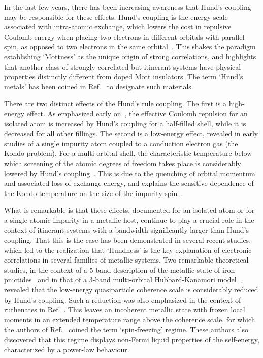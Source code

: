 \documentclass[]{ar2e-changed}%
\begin{document}
In the last few years, there has been increasing awareness that Hund's coupling may be responsible 
for these effects. 
%
Hund's coupling is the energy scale associated with intra-atomic exchange, which lowers the cost in repulsive 
Coulomb energy when placing two electrons in different orbitals with parallel spin, as opposed to two 
electrons in the same orbital~\cite{hund_1925}. 
%
This shakes the paradigm establishing `Mottness' as the unique origin of strong correlations, and 
highlights that another class of strongly correlated but itinerant systems 
have physical properties distinctly different from doped Mott insulators.
%
The term `Hund's metals' has been coined in Ref.~\cite{Yin_kinetic_frustration_allFeSC} to designate such materials. 

There are two distinct effects of the Hund's rule coupling. 
% 
The first is a high-energy effect. As emphasized early on~\cite{vandermarel_sawatzky_prb_1988,vandermarel_phd_1985}, 
the effective Coulomb repulsion for an isolated atom is increased by Hund's coupling for a half-filled shell, 
while it is decreased for all other fillings.
%
The second is a low-energy effect, revealed in early studies of a single impurity atom coupled to a 
conduction electron gas (the Kondo problem). For a multi-orbital shell, the characteristic temperature 
below which screening of the atomic degrees of freedom takes place is considerably lowered 
by Hund's coupling~\cite{okada73,jayaprakash81,jones87,kusunose97,yotsuhashi01,pruschke_epjb_2005,nevidomskiy09}.
%
This is due to the quenching of orbital momentum and associated loss of exchange energy, and 
explains the sensitive dependence of the Kondo temperature 
on the size of the impurity spin~\cite{schrieffer_japplphys_1967,blandin_japplphys_1968,daybell_rmp_1968}. 

What is remarkable is that these effects, documented for an isolated
atom or for a single atomic impurity in a metallic host, continue to
play a crucial role in the context of itinerant systems with a
bandwidth significantly larger than Hund's coupling.
%
That this is the case has been demonstrated in several recent studies, which led to the realization that `Hundness' 
is the key explanation of electronic correlations in several families of metallic systems. 
% 
Two remarkable theoretical studies, in the context of a 5-band description 
of the metallic state of iron pnictides~\cite{haule09} 
and in that of a 3-band multi-orbital Hubbard-Kanamori model~\cite{werner08}, revealed that the 
low-energy quasiparticle coherence scale is considerably reduced by Hund's coupling. 
%
Such a reduction was also emphasized in the context of ruthenates in Ref.~\cite{mravlje11}.
%
This leaves an incoherent metallic state with frozen local moments in an extended temperature range above the coherence scale, 
for which the authors of Ref.~\cite{werner08} coined the term `spin-freezing' regime. 
%
These authors also discovered that this regime displays non-Fermi liquid properties of the self-energy, 
characterized by a power-law behaviour. 
\end{document}
